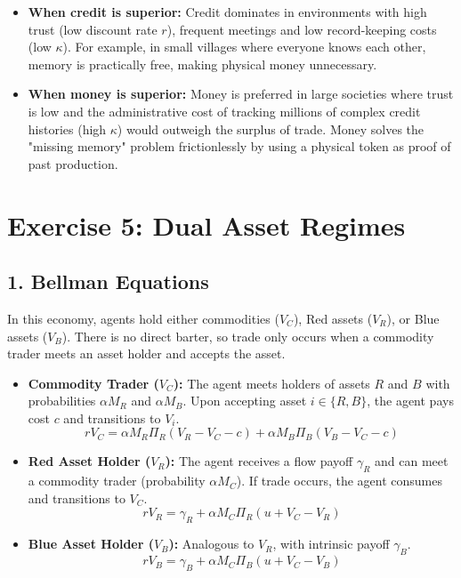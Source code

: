 \documentclass[11pt, a4paper]{article}
\begin{document}
\begin{itemize}
    \item \textbf{When credit is superior:} Credit dominates in environments with high trust (low discount rate $r$), frequent meetings and low record-keeping costs (low $\kappa$). For example, in small villages where everyone knows each other, memory is practically free, making physical money unnecessary.
    \item \textbf{When money is superior:} Money is preferred in large societies where trust is low and the administrative cost of tracking millions of complex credit histories (high $\kappa$) would outweigh the surplus of trade. Money solves the "missing memory" problem frictionlessly by using a physical token as proof of past production.
\end{itemize}


\section*{Exercise 5: Dual Asset Regimes}

\subsection*{1. Bellman Equations}

In this economy, agents hold either commodities ($V_C$), Red assets ($V_R$), or Blue assets ($V_B$). There is no direct barter, so trade only occurs when a commodity trader meets an asset holder and accepts the asset.

\begin{itemize}
    \item \textbf{Commodity Trader ($V_C$):} The agent meets holders of assets $R$ and $B$ with probabilities $\alpha M_R$ and $\alpha M_B$. Upon accepting asset $i \in \{R,B\}$, the agent pays cost $c$ and transitions to $V_i$.
    \begin{equation}
        rV_C = \alpha M_R \Pi_R (V_R - V_C - c) + \alpha M_B \Pi_B (V_B - V_C - c)
    \end{equation}

    \item \textbf{Red Asset Holder ($V_R$):} The agent receives a flow payoff $\gamma_R$ and can meet a commodity trader (probability $\alpha M_C$). If trade occurs, the agent consumes and transitions to $V_C$.
    \begin{equation}
        rV_R = \gamma_R + \alpha M_C \Pi_R (u + V_C - V_R)
    \end{equation}

    \item \textbf{Blue Asset Holder ($V_B$):} Analogous to $V_R$, with intrinsic payoff $\gamma_B$.
    \begin{equation}
        rV_B = \gamma_B + \alpha M_C \Pi_B (u + V_C - V_B)
    \end{equation}
\end{itemize}
\end{document}
